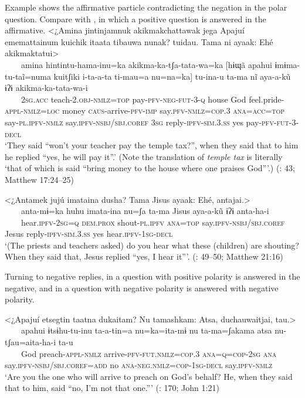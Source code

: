 \documentclass[output=paper,colorlinks,citecolor=brown,draft]{langscibook}
\begin{document}
Example  shows the affirmative particle contradicting the negation in the polar question. Compare with , in which a positive question is answered in the affirmative.
\ea\label{ex:agu:43}
    \glll <¿Amina jintinjamnuk akikmakchattawak jega Apajuí ememattainum kuichik itaata tibauwa nunak? tuidau. Tama ni ayaak: Ehé akikmaktatui>\\
          ~~~~amina  hintintu-hama-inu=ka  akikma-ka-tʃa-tata-wa=ka  [hɨɰã  apahui ɨmɨma-tu-taĩ=numa  kuitʃiki  i-ta-a-ta ti-mau=a  nu=na=ka]  tu-ina-u  ta-ma nĩ  aya-a-kũ  ɨʔɨ  akikma-ka-tata-wa-i\\
          ~~~~\textsc{2sg}.\textsc{acc}  teach-\textsc{2.obj-nmlz=top}  pay-\textsc{pfv-neg-fut-3-q}  house  God feel.pride-\textsc{appl-nmlz=loc}  money  \textsc{caus-}arrive-\textsc{pfv-imp} say.\textsc{pfv-nmlz=cop.3}  \textsc{ana=acc=top}  say-\textsc{pl.ipfv-nmlz}  say.\textsc{ipfv-nsbj/sbj.coref} \textsc{3sg}  reply-\textsc{ipfv-sim.3.ss}  yes  pay-\textsc{pfv-fut-3-decl}\\
    \glt ‘They said “won’t your teacher pay the temple tax?”, when they said that to him he replied “yes, he will pay it”.’ (Note the translation of \textit{temple tax} is literally ‘that of which is said “bring money to the house where one praises God”’.) (\citealt{LigaBíblica2008}: 43; Matthew 17:24–25)
\z 

\ea\label{ex:agu:44}
    \glll <¿Antamek jujú imataina dusha? Tama Jisus ayaak: Ehé, antajai.> \\ 
          ~~~~anta-mɨ=ka  huhu  imata-ina  nu=ʃa ta-ma  Jisus  aya-a-kũ  ɨʔɨ  anta-ha-i \\
          ~~~~hear.\textsc{ipfv-2sg=q}  \textsc{dem.prox}  shout-\textsc{pl.ipfv}  \textsc{ana=top} say.\textsc{ipfv-nsbj/sbj.coref}  Jesus  reply-\textsc{ipfv-sim.3.ss}  yes  hear.\textsc{ipfv-1sg-decl} \\
    \glt ‘(The priests and teachers asked) do you hear what these (children) are shouting? When they said that, Jesus replied “yes, I hear it”’. (\citealt{LigaBíblica2008}: 49–50; Matthew 21:16)
\z 

Turning to negative replies, in  a question with positive polarity is answered in the negative, and in  a question with negative polarity is answered with negative polarity.

\ea\label{ex:agu:45}
    \glll <¿Apajuí etsegtin taatna dukaitam? Nu tamashkam: Atsa, duchauwaitjai, tau.> \\ 
           ~~~~apahui  ɨtsɨhu-tu-inu  ta-a-tin=a  nu=ka=ita-mɨ  nu  ta-ma=ʃakama  atsa  nu-tʃau=aita-ha-i ta-u \\
           ~~~~God  preach-\textsc{appl-nmlz}  arrive-\textsc{pfv-fut.nmlz=cop.3}  \textsc{ana=q=cop-2sg} \textsc{ana}  say.\textsc{ipfv-nsbj/sbj.coref=add}  no  \textsc{ana-neg.nmlz=cop-1sg-decl} say.\textsc{ipfv-nmlz}\\
    \glt ‘Are you the one who will arrive to preach on God’s behalf? He, when they said that to him, said “no, I’m not that one.”’ (\citealt{LigaBíblica2008}: 170; John 1:21)
\z 
\end{document}
